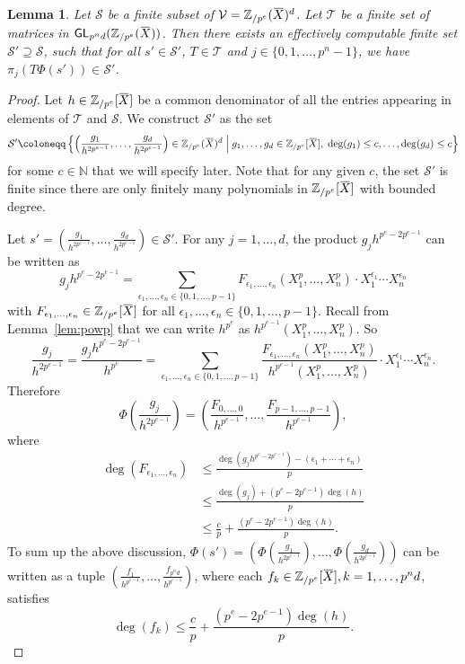 \documentclass[letterpaper, 11pt, thm-restate]{article}
\numberwithin{equation}{section}
\newcommand{\N}{\mathbb{N}}
\newcommand{\Zpe}{\mathbb{Z}_{/p^e}}
\newcommand{\GL}{\mathsf{GL}}
\newcommand{\mV}{\mathcal{V}}
\newcommand{\mT}{\mathcal{T}}
\newcommand{\mS}{\mathcal{S}}
\newcommand{\oX}{\mkern 1.5mu\overline{\mkern-1.5mu X \mkern-1.5mu}\mkern 1.5mu}
\newtheorem{lem}[thrm]{Lemma}
\theoremstyle{definition}
\theoremstyle{definition}
\theoremstyle{definition}
\begin{document}
\begin{lem}\label{lem:finite}
Let $\mS$ be a finite subset of $\mV = \Zpe(\oX)^{d}$.
Let $\mT$ be a finite set of matrices in $\GL_{p^n d}(\Zpe(\oX))$.
Then there exists an effectively computable finite set $\mS' \supseteq \mS$, such that for all $s' \in \mS'$, $T \in \mT$ and $j \in \{0, 1, \ldots, p^n-1\}$, we have $\pi_j(T\Phi(s')) \in \mS'$.
\end{lem}
\begin{proof}
    Let $h \in \Zpe[\oX]$ be a common denominator of all the entries appearing in elements of $\mT$ and $\mS$.
    We construct $\mS'$ as the set
    \begin{equation}\label{eq:defsprime}
    \mS' \coloneqq \left\{\left(\frac{g_1}{h^{2p^{e-1}}}, \ldots, \frac{g_d}{h^{2p^{e-1}}}\right) \in \Zpe(\oX)^d \;\middle|\; g_1, \ldots, g_d \in \Zpe[\oX], \; \deg(g_1) \leq c, \ldots, \deg(g_d) \leq c \right\}
    \end{equation}
    for some $c \in \N$ that we will specify later.
    Note that for any given $c$, the set $\mS'$ is finite since there are only finitely many polynomials in $\Zpe[\oX]$ with bounded degree.

    Let $s' = \left(\frac{g_1}{h^{2p^{e-1}}}, \ldots, \frac{g_d}{h^{2p^{e-1}}}\right) \in \mS'$.
    For any $j = 1, \ldots, d$, the product $g_j h^{p^e - 2p^{e-1}}$ can be written as
    \[
    g_j h^{p^e - 2p^{e-1}} = \sum_{\epsilon_1, \ldots, \epsilon_n \in \{0, 1, \ldots, p-1\}} F_{\epsilon_1, \ldots, \epsilon_n}(X_1^{p}, \ldots, X_n^p) \cdot X_1^{\epsilon_1} \cdots X_n^{\epsilon_n}
    \]
    with $F_{\epsilon_1, \ldots, \epsilon_n} \in \Zpe[\oX]$ for all $\epsilon_1, \ldots, \epsilon_n \in \{0, 1, \ldots, p-1\}$.
    Recall from Lemma~\ref{lem:powp} that we can write $h^{p^e}$ as $h^{p^{e-1}}(X_1^{p}, \ldots, X_n^p)$.
    So
    \[
    \frac{g_j}{h^{2p^{e-1}}} = \frac{g_j h^{p^e - 2p^{e-1}}}{h^{p^e}} = \sum_{\epsilon_1, \ldots, \epsilon_n \in \{0, 1, \ldots, p-1\}} \frac{F_{\epsilon_1, \ldots, \epsilon_n}(X_1^{p}, \ldots, X_n^p)}{h^{p^{e-1}}(X_1^{p}, \ldots, X_n^p)} \cdot X_1^{\epsilon_1} \cdots X_n^{\epsilon_n}.
    \]
    Therefore
    \[
    \Phi\left(\frac{g_j}{h^{2p^{e-1}}}\right) = \left(\frac{F_{0,\ldots,0}}{h^{p^{e-1}}}, \ldots, \frac{F_{p-1, \ldots, p-1}}{h^{p^{e-1}}}\right),
    \]
    where
    \begin{align*}
        \deg(F_{\epsilon_1, \ldots, \epsilon_n}) & \leq \frac{\deg(g_j h^{p^e - 2p^{e-1}}) - (\epsilon_1 + \cdots + \epsilon_n)}{p} \\
        & \leq \frac{\deg(g_j) + (p^e - 2p^{e-1}) \deg(h)}{p} \\
        & \leq \frac{c}{p} + \frac{(p^e - 2p^{e-1})\deg(h)}{p}.
    \end{align*}
    To sum up the above discussion, $\Phi(s') = \left(\Phi\left(\frac{g_1}{h^{2p^{e-1}}}\right), \ldots, \Phi\left(\frac{g_d}{h^{2p^{e-1}}}\right)\right)$ can be written as a tuple $\left(\frac{f_1}{h^{p^{e-1}}}, \ldots, \frac{f_{p^n d}}{h^{p^{e-1}}} \right)$, where each $f_k \in \Zpe[\oX], k = 1, \ldots, p^nd$, satisfies 
    \begin{equation}\label{eq:bounddegf}
    \deg(f_k) \leq \frac{c}{p} + \frac{(p^e - 2p^{e-1})\deg(h)}{p}.
    \end{equation}


\end{proof}
\end{document}
